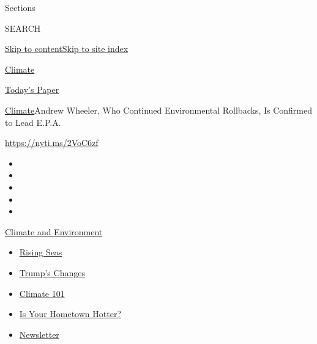 Sections

SEARCH

\protect\hyperlink{site-content}{Skip to
content}\protect\hyperlink{site-index}{Skip to site index}

\href{https://www.nytimes.com/section/climate}{Climate}

\href{https://myaccount.nytimes.com/auth/login?response_type=cookie\&client_id=vi}{}

\href{https://www.nytimes.com/section/todayspaper}{Today's Paper}

\href{/section/climate}{Climate}\textbar{}Andrew Wheeler, Who Continued
Environmental Rollbacks, Is Confirmed to Lead E.P.A.

\url{https://nyti.ms/2VoC6zf}

\begin{itemize}
\item
\item
\item
\item
\item
\end{itemize}

\href{https://www.nytimes.com/section/climate?action=click\&pgtype=Article\&state=default\&region=TOP_BANNER\&context=storylines_menu}{Climate
and Environment}

\begin{itemize}
\tightlist
\item
  \href{https://www.nytimes.com/2020/07/30/climate/sea-level-inland-floods.html?action=click\&pgtype=Article\&state=default\&region=TOP_BANNER\&context=storylines_menu}{Rising
  Seas}
\item
  \href{https://www.nytimes.com/interactive/2020/climate/trump-environment-rollbacks.html?action=click\&pgtype=Article\&state=default\&region=TOP_BANNER\&context=storylines_menu}{Trump's
  Changes}
\item
  \href{https://www.nytimes.com/interactive/2020/04/19/climate/climate-crash-course-1.html?action=click\&pgtype=Article\&state=default\&region=TOP_BANNER\&context=storylines_menu}{Climate
  101}
\item
  \href{https://www.nytimes.com/interactive/2018/08/30/climate/how-much-hotter-is-your-hometown.html?action=click\&pgtype=Article\&state=default\&region=TOP_BANNER\&context=storylines_menu}{Is
  Your Hometown Hotter?}
\item
  \href{https://www.nytimes.com/newsletters/climate-change?action=click\&pgtype=Article\&state=default\&region=TOP_BANNER\&context=storylines_menu}{Newsletter}
\end{itemize}


